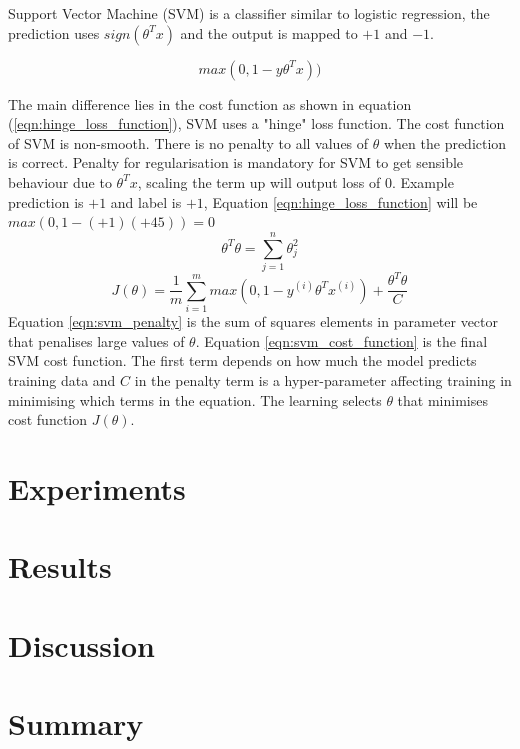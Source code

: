 \documentclass[transmag]{IEEEtran}
\begin{document}
\noindent Support Vector Machine (SVM) is a classifier similar to logistic regression, the prediction uses $sign(\theta^Tx)$ and the output is mapped to $+1$ and $-1$. 

\begin{equation}
\label{eqn:hinge_loss_function}
max(0,1-y\theta^Tx))
\end{equation}

\noindent The main difference lies in the cost function as shown in equation (\ref{eqn:hinge_loss_function}), SVM uses a "hinge" loss function. The cost function of SVM is non-smooth. There is no penalty to all values of $\theta$ when the prediction is correct. Penalty for regularisation is mandatory for SVM to get sensible behaviour due to $\theta^Tx$, scaling the term up will output loss of 0. Example prediction is $+1$ and label is $+1$, Equation \ref{eqn:hinge_loss_function} will be $max(0, 1 - (+1)(+45)) = 0$
\begin{equation}
\label{eqn:svm_penalty}
\theta^T\theta = \sum^n_{j=1} \theta^2_j
\end{equation}
\begin{equation}
\label{eqn:svm_cost_function}
J(\theta) = \frac{1}{m}\sum^m_{i=1}max(0,1-y^{(i)}\theta^Tx^{(i)})+\frac{\theta^T\theta}{C}
\end{equation}
Equation \ref{eqn:svm_penalty} is the sum of squares elements in parameter vector that penalises large values of $\theta$. Equation \ref{eqn:svm_cost_function} is the final SVM cost function. The first term depends on how much the model predicts training data and $C$ in the penalty term is a hyper-parameter affecting training in minimising which terms in the equation. The learning selects $\theta$ that minimises cost function $J(\theta)$.

\subsection{}

\section{Experiments}

\section{Results}

\section{Discussion}

\section{Summary}












\end{document}
